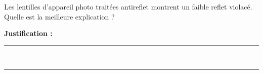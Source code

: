 Les lentilles d'appareil photo traitées antireflet montrent un faible reflet violacé. Quelle est la meilleure explication ?

\choices

\noindent\textbf{Justification :} \hrulefill \\[2.5ex]
\rule{\linewidth}{0.4pt} \\[2.5ex]
\rule{\linewidth}{0.4pt}
\vfill

